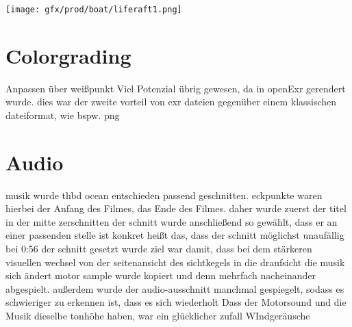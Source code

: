 \texttt{[image: gfx/prod/boat/liferaft1.png]}


\section{Colorgrading}

Anpassen über weißpunkt
Viel Potenzial übrig gewesen, da in openExr gerendert wurde.
dies war der zweite vorteil von exr dateien gegenüber einem klassischen dateiformat, wie bspw. png

\section{Audio}

musik wurde thbd ocean entschieden
passend geschnitten. eckpunkte waren hierbei der Anfang des Filmes, das Ende des Filmes.
daher wurde zuerst der titel in der mitte zerschnitten
der schnitt wurde anschließend so gewählt, dass er an einer passenden stelle ist
konkret heißt das, dass der schnitt möglichst unaufällig bei 0:56 der schnitt gesetzt wurde
ziel war damit, dass bei dem stärkeren visuellen wechsel von der seitenansicht des sichtkegels in die draufsicht die musik sich ändert
motor sample wurde kopiert und denn mehrfach nacheinander abgespielt. außerdem wurde der audio-ausschnitt manchmal gespiegelt, sodass es schwieriger zu erkennen ist, dass es sich wiederholt
Dass der Motorsound und die Musik dieselbe tonhöhe haben, war ein glücklicher zufall
WIndgeräusche